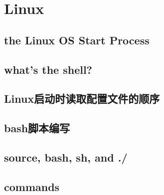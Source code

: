 \chapter{Linux}
\section{the Linux OS Start Process }
    
\section{what's the shell?}
    
\section{Linux启动时读取配置文件的顺序}
    
\section{bash脚本编写}
    
    
    

\section{source, bash, sh, and ./}
    

\section{commands}
    